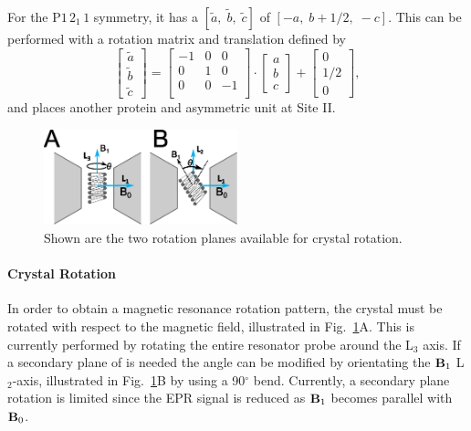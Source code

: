 For the P$1\,2_1\,1$ symmetry, it has a $[\tilde{a},\;\tilde{b},\;\tilde{c}]$ of $[-a,\;b+1/2,\;-c]$. This can be performed with a rotation matrix and translation defined by 
\begin{equation}
     \begin{bmatrix}
  \tilde{a} \\
  \tilde{b} \\
  \tilde{c} 
  \end{bmatrix} = \begin{bmatrix}
   -1 & 0 & 0\\
    0 & 1 & 0\\
    0 &  0 & -1\\
   \end{bmatrix} \cdot      \begin{bmatrix}
  a \\
  b \\
  c 
  \end{bmatrix} + \begin{bmatrix}
  0 \\
  1/2 \\
  0 
  \end{bmatrix},
\end{equation}
and places another protein and asymmetric unit at Site II. 

\begin{figure}[htb]
 \centering
 \includegraphics[width=0.5\textwidth]{Kapitel/Ch2-Images/RotateMeLeftRight.eps}
 \caption[Rotation Planes of micro-Helix.]{Shown are the two rotation planes available for crystal rotation.}
 \label{fig:RotateMe}
\end{figure}

\paragraph*{Crystal Rotation} In order to obtain a magnetic resonance rotation pattern, the crystal must be rotated with respect to the magnetic field, illustrated in Fig.~\ref{fig:RotateMe}A. This is currently performed by rotating the entire resonator probe around the L$_3$ axis. If a secondary plane of is needed the angle can be modified by orientating the ${\textbf B}_1$ L$_2$-axis, illustrated in Fig.~\ref{fig:RotateMe}B by using a 90$^{\circ}$ bend. Currently, a secondary plane rotation is limited since the EPR signal is reduced as ${\textbf B}_1$ becomes parallel with ${\textbf B}_0$. 

